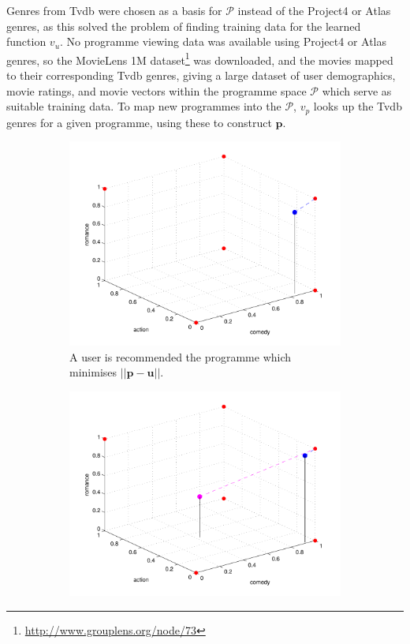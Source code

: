 	Genres from Tvdb were chosen as a basis for $\mathcal{P}$ instead of the Project4 or Atlas genres, as this solved the problem of finding training data for the learned function $v_u$. No programme viewing data was available using Project4 or Atlas genres, so the MovieLens 1M dataset\footnote{\url{http://www.grouplens.org/node/73}} was downloaded, and the movies mapped to their corresponding Tvdb genres, giving a large dataset of user demographics, movie ratings, and movie vectors within the programme space $\mathcal{P}$ which serve as suitable training data. To map new programmes into the $\mathcal{P}$, $v_p$ looks up the Tvdb genres for a given programme, using these to construct $\mathbf{p}$.

		\begin{figure}[h!]
			\begin{center}
			\begin{subfigure}[t]{0.32\textwidth}
				\includegraphics[width=\textwidth]{images/recommender_1.pdf}
				\caption{A user is recommended the programme which minimises $||\mathbf{p} - \mathbf{u}||$.}
			\end{subfigure}
			\begin{subfigure}[t]{0.32\textwidth}
				\includegraphics[width=\textwidth]{images/recommender_2.pdf}

\end{subfigure}
\end{center}
\end{figure}

